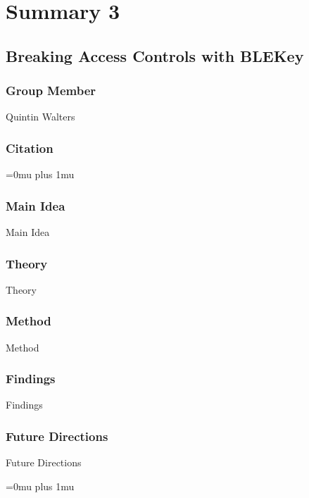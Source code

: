\section{Summary 3}

\noindent
\subsection{Breaking Access Controls with BLEKey}

\subsubsection{Group Member}

\noindent
Quintin Walters

\noindent
\subsubsection{Citation}

\Urlmuskip=0mu plus 1mu\relax

\subsubsection{Main Idea}

\noindent
Main Idea

\subsubsection{Theory}

\noindent
Theory

\subsubsection{Method}

\noindent
Method

\subsubsection{Findings}

\noindent
Findings

\subsubsection{Future Directions}

\noindent
Future Directions 

\Urlmuskip=0mu plus 1mu\relax

\pagebreak